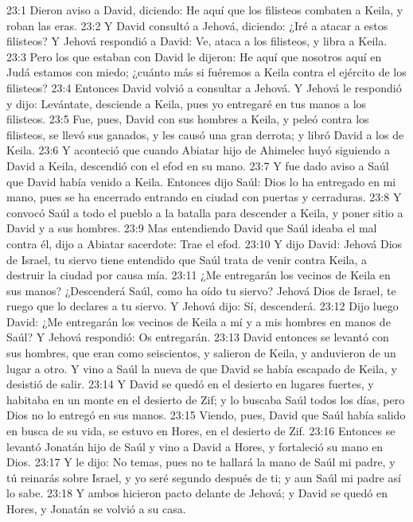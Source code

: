 23:1 Dieron aviso a David, diciendo: He aquí que los filisteos combaten a Keila, y roban las eras.  
23:2 Y David consultó a Jehová, diciendo: ¿Iré a atacar a estos filisteos? Y Jehová respondió a David: Ve, ataca a los filisteos, y libra a Keila.  
23:3 Pero los que estaban con David le dijeron: He aquí que nosotros aquí en Judá estamos con miedo; ¿cuánto más si fuéremos a Keila contra el ejército de los filisteos?  
23:4 Entonces David volvió a consultar a Jehová. Y Jehová le respondió y dijo: Levántate, desciende a Keila, pues yo entregaré en tus manos a los filisteos.  
23:5 Fue, pues, David con sus hombres a Keila, y peleó contra los filisteos, se llevó sus ganados, y les causó una gran derrota; y libró David a los de Keila.  
23:6 Y aconteció que cuando Abiatar hijo de Ahimelec huyó siguiendo a David a Keila, descendió con el efod en su mano.  
23:7 Y fue dado aviso a Saúl que David había venido a Keila. Entonces dijo Saúl: Dios lo ha entregado en mi mano, pues se ha encerrado entrando en ciudad con puertas y cerraduras.  
23:8 Y convocó Saúl a todo el pueblo a la batalla para descender a Keila, y poner sitio a David y a sus hombres.  
23:9 Mas entendiendo David que Saúl ideaba el mal contra él, dijo a Abiatar sacerdote: Trae el efod.  
23:10 Y dijo David: Jehová Dios de Israel, tu siervo tiene entendido que Saúl trata de venir contra Keila, a destruir la ciudad por causa mía.  
23:11 ¿Me entregarán los vecinos de Keila en sus manos? ¿Descenderá Saúl, como ha oído tu siervo? Jehová Dios de Israel, te ruego que lo declares a tu siervo. Y Jehová dijo: Sí, descenderá.  
23:12 Dijo luego David: ¿Me entregarán los vecinos de Keila a mí y a mis hombres en manos de Saúl? Y Jehová respondió: Os entregarán.  
23:13 David entonces se levantó con sus hombres, que eran como seiscientos, y salieron de Keila, y anduvieron de un lugar a otro. Y vino a Saúl la nueva de que David se había escapado de Keila, y desistió de salir.  
23:14 Y David se quedó en el desierto en lugares fuertes, y habitaba en un monte en el desierto de Zif; y lo buscaba Saúl todos los días, pero Dios no lo entregó en sus manos.  
23:15 Viendo, pues, David que Saúl había salido en busca de su vida, se estuvo en Hores, en el desierto de Zif.  
23:16 Entonces se levantó Jonatán hijo de Saúl y vino a David a Hores, y fortaleció su mano en Dios.  
23:17 Y le dijo: No temas, pues no te hallará la mano de Saúl mi padre, y tú reinarás sobre Israel, y yo seré segundo después de ti; y aun Saúl mi padre así lo sabe.  
23:18 Y ambos hicieron pacto delante de Jehová; y David se quedó en Hores, y Jonatán se volvió a su casa.  
